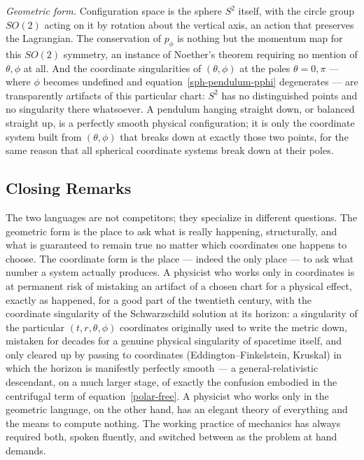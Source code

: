 \emph{Geometric form.} Configuration space is the sphere $S^2$
itself, with the circle group $SO(2)$ acting on it by rotation about
the vertical axis, an action that preserves the Lagrangian. The
conservation of $p_\phi$ is nothing but the momentum map for this
$SO(2)$ symmetry, an instance of Noether's theorem requiring no
mention of $\theta,\phi$ at all. And the coordinate singularities of
$(\theta,\phi)$ at the poles $\theta=0,\pi$ --- where $\phi$ becomes
undefined and equation~\eqref{sph-pendulum-pphi} degenerates ---
are transparently artifacts of this particular chart: $S^2$ has no
distinguished points and no singularity there whatsoever. A pendulum
hanging straight down, or balanced straight up, is a perfectly smooth
physical configuration; it is only the coordinate system built from
$(\theta,\phi)$ that breaks down at exactly those two points, for the
same reason that all spherical coordinate systems break down at their
poles.

\subsection{Closing Remarks}

The two languages are not competitors; they specialize in different
questions. The geometric form is the place to ask what is really
happening, structurally, and what is guaranteed to remain true no
matter which coordinates one happens to choose. The coordinate form
is the place --- indeed the only place --- to ask what number a
system actually produces. A physicist who works only in coordinates
is at permanent risk of mistaking an artifact of a chosen chart for a
physical effect, exactly as happened, for a good part of the
twentieth century, with the coordinate singularity of the
Schwarzschild solution at its horizon: a singularity of the
particular $(t,r,\theta,\phi)$ coordinates originally used to write
the metric down, mistaken for decades for a genuine physical
singularity of spacetime itself, and only cleared up by passing to
coordinates (Eddington--Finkelstein, Kruskal) in which the horizon is
manifestly perfectly smooth --- a general-relativistic descendant, on
a much larger stage, of exactly the confusion embodied in the
centrifugal term of equation~\eqref{polar-free}. A physicist who
works only in the geometric language, on the other hand, has an
elegant theory of everything and the means to compute nothing. The
working practice of mechanics has always required both, spoken
fluently, and switched between as the problem at hand demands.

